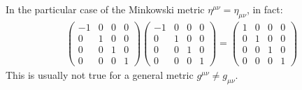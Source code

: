 \documentclass[../template.tex]{subfiles}
\begin{document}
In the particular case of the Minkowski metric $\eta^{\mu\nu} = \eta_{\mu\nu}$, in fact:
\begin{align*}
\begin{pmatrix}
-1 & 0 & 0 & 0\\
0 & 1 & 0 & 0\\
0 & 0 & 1 & 0\\
0 & 0 & 0 & 1\end{pmatrix}
\begin{pmatrix} -1 & 0 & 0 & 0\\
0 & 1 & 0 & 0\\
0 & 0 & 1 & 0\\
0 & 0 & 0 & 1\end{pmatrix} =
\begin{pmatrix}
1 & 0 & 0 & 0\\
0 & 1 & 0 & 0\\
0 & 0 & 1 & 0\\
0 & 0 & 0 & 1 \end{pmatrix}
\end{align*}
This is usually not true for a general metric $g^{\mu\nu} \neq g_{\mu\nu}$.
\end{document}
